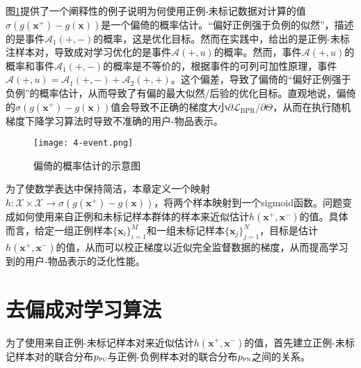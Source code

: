 图\ref{fig:event}提供了一个阐释性的例子说明为何使用正例-未标记数据对计算的值$\sigma(g(\mathbf{x}^+) - g(\mathbf{x}))$是一个偏倚的概率估计。“偏好正例强于负例的似然”，描述的是事件$\mathcal{A}_1(+,-)$的概率，这是优化目标。然而在实践中，给出的是正例-未标注样本对，导致成对学习优化的是事件$\mathcal{A}(+,u)$的概率。然而，事件$\mathcal{A}(+,u)$的概率和事件$\mathcal{A}_1(+,-)$的概率是不等价的，根据事件的可列可加性原理，事件$\mathcal{A}(+,u) = \mathcal{A}_1(+,-) + \mathcal{A}_2(+,+)$。这个偏差，导致了偏倚的“偏好正例强于负例”的概率估计，从而导致了有偏的最大似然/后验的优化目标。直观地说，偏倚的$\sigma(g(\mathbf{x}^+) - g(\mathbf{x}))$值会导致不正确的梯度大小${\partial \mathcal{L}_\text{BPR}}/{\partial \Theta}$，从而在执行随机梯度下降学习算法时导致不准确的用户-物品表示。
\begin{figure}[h!]
	\centering
	\texttt{[image: 4-event.png]}
	\caption{偏倚的概率估计的示意图} 
	\label{fig:event}
\end{figure}

为了使数学表达中保持简洁，本章定义一个映射$h: \mathcal{X}\times\mathcal{X} \rightarrow \sigma(g(\mathbf{x}^+) - g(\mathbf{x}))$，将两个样本映射到一个sigmoid函数。问题变成如何使用来自正例和未标记样本群体的样本来近似估计$h(\mathbf{x}^+,\mathbf{x}^-)$的值。具体而言，给定一组正例样本$\{\mathbf{x}_i\}_{i=1}^M$和一组未标记样本$\{\mathbf{x}_j\}_{j=1}^N$，目标是估计$h(\mathbf{x}^+,\mathbf{x}^-)$的值，从而可以校正梯度以近似完全监督数据的梯度，从而提高学习到的用户-物品表示的泛化性能。

\section{去偏成对学习算法}
为了使用来自正例-未标记样本对来近似估计$h(\mathbf{x}^+,\mathbf{x}^-)$的值，首先建立正例-未标记样本对的联合分布$p_\textsc{pu}$与正例-负例样本对的联合分布$p_\textsc{pn}$之间的关系。

